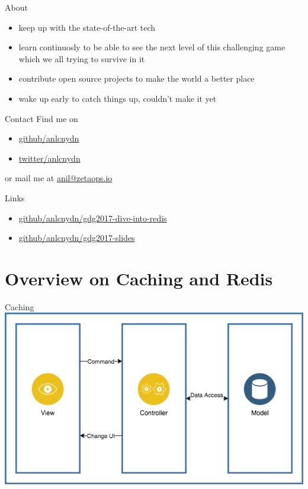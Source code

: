 \documentclass[10pt]{beamer}
\begin{document}
\begin{frame}[fragile]{About}
\begin{itemize}
      \begin{itemize}
        \item keep up with the state-of-the-art tech
        \item learn continuosly to be able to see the next level of this
        challenging game which we all trying to survive in it
        \item contribute open source projects to make the world a better place
        \item wake up early to catch things up, couldn't make it yet
      \end{itemize}
  \end{itemize}
\end{frame}

\begin{frame}[fragile]{Contact}
  Find me on
  \begin{itemize}
    \item \href{https://github.com/anlcnydn}{github/anlcnydn}
    \item \href{https://twitter.com/anlcnydn}{twitter/anlcnydn}
  \end{itemize}
  or mail me at \href{mailto:anil@zetaops.io}{anil@zetaops.io}
\end{frame}

\begin{frame}[fragile]{Links}
  \begin{itemize}
    \item \href{https://github.com/anlcnydn/gdg2017-dive-into-redis}{github/anlcnydn/gdg2017-dive-into-redis}
    \item \href{https://github.com/anlcnydn/gdg2017-slides}{github/anlcnydn/gdg2017-slides}
  \end{itemize}
\end{frame}

\section{Overview on Caching and Redis}

\begin{frame}[fragile]{Caching}
  \includegraphics[scale=0.5]{img/mvc-classic}
\end{frame}
\end{document}
